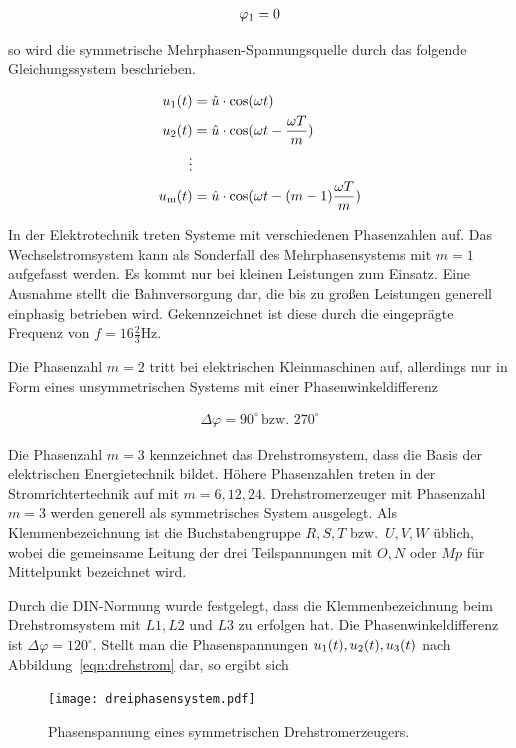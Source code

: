 \begin{align*}
\varphi_{\mathrm{1}} = 0
\end{align*}

so wird die symmetrische Mehrphasen-Spannungsquelle durch das folgende Gleichungssystem beschrieben.

\begin{align}
u_{\mathrm{1}}(t) &= \hat{u} \cdot \cos(\omega t) \label{eqn:drehstrom} \\ 
u_{\mathrm{2}}(t) &= \hat{u} \cdot \cos(\omega t - \frac{\omega T}{m})\nonumber \\
\vdots \nonumber \\
u_{\mathrm{m}}(t) &= \hat{u} \cdot \cos(\omega t - (m-1)\frac{\omega T}{m})\nonumber
\end{align}

In der Elektrotechnik treten Systeme mit verschiedenen Phasenzahlen auf.
Das Wechselstromsystem kann als Sonderfall des Mehrphasensystems mit $m=1$ aufgefasst werden.
Es kommt nur bei kleinen Leistungen zum Einsatz.
Eine Ausnahme stellt die Bahnversorgung dar, die bis zu großen Leistungen generell einphasig betrieben wird.
Gekennzeichnet ist diese durch die eingeprägte Frequenz von $f = 16\frac{2}{3}\mbox{Hz}$.

Die Phasenzahl $m=2$ tritt bei elektrischen Kleinmaschinen auf, allerdings nur in Form eines unsymmetrischen Systems mit einer Phasenwinkeldifferenz

\begin{align*}
\Delta \varphi = 90^{\circ} \,\text{bzw.\ } 270^{\circ}
\end{align*}

Die Phasenzahl $m=3$ kennzeichnet das Drehstromsystem, dass die Basis der elektrischen Energietechnik bildet.
Höhere Phasenzahlen treten \zB in der Stromrichtertechnik auf mit $m=6, 12, 24$.
Drehstromerzeuger mit Phasenzahl $m=3$ werden generell als symmetrisches System ausgelegt.
Als Klemmenbezeichnung ist die Buchstabengruppe $R, S, T$ bzw.\ $U, V, W$ üblich, wobei die gemeinsame Leitung der drei Teilspannungen mit $O, N$ oder $Mp$ für Mittelpunkt bezeichnet wird.

Durch die DIN-Normung wurde festgelegt, dass die Klemmenbezeichnung beim Drehstromsystem mit $L1, L2$ und $L3$ zu erfolgen hat.
Die Phasenwinkeldifferenz ist $\Delta \varphi = 120^{\circ}$.
Stellt man die Phasenspannungen $u_{\mathrm{1}}(t), u_{\mathrm{2}}(t), u_{\mathrm{3}}(t)$ nach Abbildung~\ref{eqn:drehstrom} dar, so ergibt sich 

\begin{figure}[!h]
\centering
\texttt{[image: dreiphasensystem.pdf]}
\label{fig:dreiphasen}
\caption{Phasenspannung eines symmetrischen Drehstromerzeugers.}
\end{figure}

